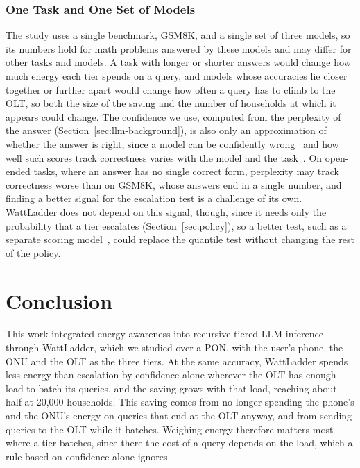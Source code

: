 \documentclass[cic,dipl,english]{infufrgs}
\begin{document}
\subsection{One Task and One Set of Models}

The study uses a single benchmark, GSM8K, and a single set of three models, so its numbers hold
for math problems answered by these models and may differ for other tasks and models. A task
with longer or shorter answers would change how much energy each tier spends on a query, and
models whose accuracies lie closer together or further apart would change how often a query has
to climb to the OLT, so both the size of the saving and the number of households at which it
appears could change. The confidence we use, computed from the perplexity of the answer
(Section~\ref{sec:llm-background}), is also only an approximation of whether the answer is
right, since a model can be confidently wrong~\cite{guo2017calibration} and how well such scores
track correctness varies with the model and the task~\cite{geng2023survey}. On open-ended tasks,
where an answer has no single correct form, perplexity may track correctness worse than on
GSM8K, whose answers end in a single number, and finding a better signal for the escalation test
is a challenge of its own. WattLadder does not depend on this signal, though, since it needs
only the probability that a tier escalates (Section~\ref{sec:policy}), so a better test, such as
a separate scoring model~\cite{chen2024frugalgpt}, could replace the quantile test without
changing the rest of the policy.


\chapter{Conclusion}
\label{chap:conclusion}

This work integrated energy awareness into recursive tiered LLM inference through WattLadder,
which we studied over a PON, with the user's phone, the ONU and the OLT as the three tiers. At
the same accuracy, WattLadder spends less energy than escalation by confidence alone wherever
the OLT has enough load to batch its queries, and the saving grows with that load, reaching about
half at 20,000 households. This saving comes from no longer spending the phone's and the ONU's
energy on queries that end at the OLT anyway, and from sending queries to the OLT while it
batches. Weighing energy therefore matters most where a tier batches, since there the cost of a
query depends on the load, which a rule based on confidence alone ignores.
\end{document}
